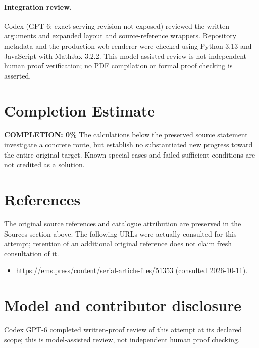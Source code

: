 \documentclass[11pt]{article}
\begin{document}
\paragraph{Integration review.} Codex (GPT-6; exact serving revision not exposed) reviewed the written arguments and expanded layout and source-reference wrappers. Repository metadata and the production web renderer were checked using Python 3.13 and JavaScript with MathJax 3.2.2. This model-assisted review is not independent human proof verification; no PDF compilation or formal proof checking is asserted.

\section{Completion Estimate}
\noindent\textbf{COMPLETION: 0\%}
The calculations below the preserved source statement investigate a concrete route,
but establish no substantiated new progress toward the entire original target.
Known special cases and failed sufficient conditions are not credited as a solution.
\section{References}
The original source references and catalogue attribution are preserved in the
Sources section above. The following URLs were actually consulted for this attempt;
retention of an additional original reference does not claim fresh consultation of it.
\begin{itemize}
\item \url{https://ems.press/content/serial-article-files/51353} (consulted 2026-10-11). 
\end{itemize}
\section{Model and contributor disclosure}
Codex GPT-6 completed written-proof review of this attempt at its declared scope; this is model-assisted review, not independent human proof checking.
\end{document}
